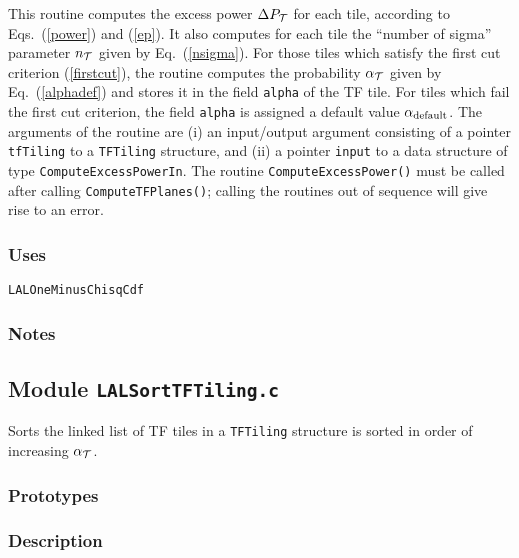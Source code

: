 This routine computes the excess power $\Delta
P_{\cal T}$ for each tile, according to Eqs.\ (\ref{power}) and (\ref{ep}).
It also computes for each tile the ``number of sigma'' parameter $n_{\cal T}$
given by Eq.\ (\ref{nsigma}).  For those tiles which satisfy the first cut
criterion (\ref{firstcut}), the routine computes the probability $\alpha_{\cal
T}$ given by Eq.\ (\ref{alphadef}) and stores it in the field \verb+alpha+ of
the TF tile.  For tiles which fail the first cut criterion, the field
\verb+alpha+ is assigned a default value $\alpha_{\rm default}$.  The
arguments of the routine are (i) an input/output argument consisting of a
pointer \verb+tfTiling+ to a \verb+TFTiling+ structure, and (ii) a pointer
\verb+input+ to a data structure of type \verb+ComputeExcessPowerIn+.  The
routine \verb+ComputeExcessPower()+ must be called after calling
\verb+ComputeTFPlanes()+; calling the routines out of sequence will give rise
to an error.

\subsubsection*{Uses}
\begin{verbatim}
LALOneMinusChisqCdf
\end{verbatim}

\subsubsection*{Notes}

\vfill{\footnotesize}

\newpage
\subsection{Module \texttt{LALSortTFTiling.c}}
\label{ss:LALSortTFTiling.c}

Sorts the linked list of TF tiles in a \verb+TFTiling+ structure is
sorted in order of increasing $\alpha_{\cal T}$.

\subsubsection*{Prototypes}
\vspace{0.1in}


\subsubsection*{Description}

